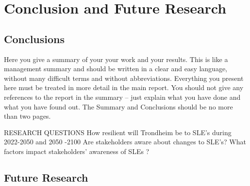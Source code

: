 
\chapter{Conclusion and Future Research}
\section{Conclusions}
Here you give a summary of your your work and your results. This is like a management summary and should be written in a clear and easy language, without many difficult terms and without abbreviations. Everything you present here must be treated in more detail in the main report. You should not give any references to the report in the summary -- just explain what you have done and what you have found out. The Summary and Conclusions should be no more than two pages.

RESEARCH QUESTIONS
How resilient will Trondheim be to SLE’s during 2022-2050 and 2050 -2100
Are stakeholders aware about changes to SLE’s?
What factors impact stakeholders’ awareness of SLEs ?

\section{Future Research}
